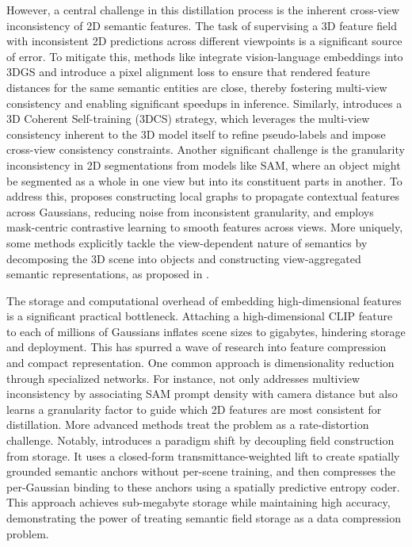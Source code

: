 \documentclass[11pt]{article}
\begin{document}
However, a central challenge in this distillation process is the inherent cross-view inconsistency of 2D semantic features. The task of supervising a 3D feature field with inconsistent 2D predictions across different viewpoints is a significant source of error. To mitigate this, methods like \cite{ref494} integrate vision-language embeddings into 3DGS and introduce a pixel alignment loss to ensure that rendered feature distances for the same semantic entities are close, thereby fostering multi-view consistency and enabling significant speedups in inference. Similarly, \cite{ref493} introduces a 3D Coherent Self-training (3DCS) strategy, which leverages the multi-view consistency inherent to the 3D model itself to refine pseudo-labels and impose cross-view consistency constraints. Another significant challenge is the granularity inconsistency in 2D segmentations from models like SAM, where an object might be segmented as a whole in one view but into its constituent parts in another. To address this, \cite{ref495} proposes constructing local graphs to propagate contextual features across Gaussians, reducing noise from inconsistent granularity, and employs mask-centric contrastive learning to smooth features across views. More uniquely, some methods explicitly tackle the view-dependent nature of semantics by decomposing the 3D scene into objects and constructing view-aggregated semantic representations, as proposed in \cite{ref496}.

The storage and computational overhead of embedding high-dimensional features is a significant practical bottleneck. Attaching a high-dimensional CLIP feature to each of millions of Gaussians inflates scene sizes to gigabytes, hindering storage and deployment. This has spurred a wave of research into feature compression and compact representation. One common approach is dimensionality reduction through specialized networks. For instance, \cite{ref497} not only addresses multiview inconsistency by associating SAM prompt density with camera distance but also learns a granularity factor to guide which 2D features are most consistent for distillation. More advanced methods treat the problem as a rate-distortion challenge. Notably, \cite{ref498} introduces a paradigm shift by decoupling field construction from storage. It uses a closed-form transmittance-weighted lift to create spatially grounded semantic anchors without per-scene training, and then compresses the per-Gaussian binding to these anchors using a spatially predictive entropy coder. This approach achieves sub-megabyte storage while maintaining high accuracy, demonstrating the power of treating semantic field storage as a data compression problem.
\end{document}
